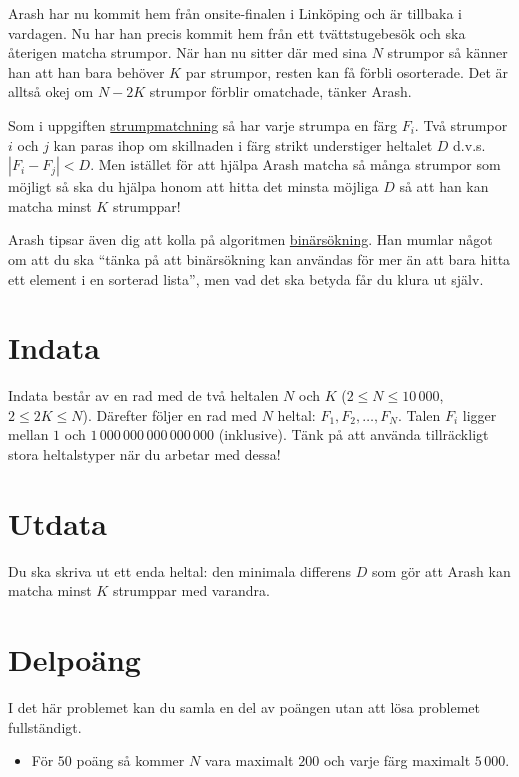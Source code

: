 
Arash har nu kommit hem från onsite-finalen i Linköping och är tillbaka i
vardagen. Nu har han precis kommit hem från ett tvättstugebesök och ska
återigen matcha strumpor. När han nu sitter där med sina $N$ strumpor
så känner han att han bara behöver $K$ par strumpor, resten kan få förbli
osorterade. Det är alltså okej om $N-2K$ strumpor förblir omatchade, tänker Arash.

Som i uppgiften \href{https://po.scrool.se/problems/strumpor}{strumpmatchning}
så har varje strumpa en färg $F_i$. Två strumpor $i$ och $j$ kan paras ihop om
skillnaden i färg strikt understiger heltalet $D$ d.v.s. $|F_{i} - F_{j}|<D$.
Men istället för att hjälpa Arash matcha så många strumpor som möjligt så ska
du hjälpa honom att hitta det minsta möjliga $D$
så att han kan matcha minst $K$ strumppar!

Arash tipsar även dig att kolla på algoritmen
\href{http://www.progolymp.se/Oldpage/ioitraning/dictionary.htm}{binärsökning}.
Han mumlar något om att du ska ``tänka på att binärsökning kan användas för mer än
att bara hitta ett element i en sorterad lista'', men vad det ska betyda får du
klura ut själv.

\section*{Indata}

Indata består av en rad med de två heltalen $N$ och $K$ ($2 \le N
\le 10\,000$, $2 \le 2K \le N$). Därefter följer en rad med $N$
heltal: $F_1, F_2, \dots, F_N$. Talen $F_i$ ligger mellan $1$
och $1\,000\,000\,000\,000\,000$ (inklusive). Tänk på att använda
tillräckligt stora heltalstyper när du arbetar med dessa!

\section*{Utdata}

Du ska skriva ut ett enda heltal: den minimala differens $D$ som gör att Arash kan
matcha minst $K$ strumppar med varandra.

\section*{Delpoäng}

I det här problemet kan du samla en del av poängen utan att lösa
problemet fullständigt.

\begin{itemize}
    \item För $50$ poäng så kommer $N$ vara maximalt $200$ och varje färg maximalt $5\,000$.
\end{itemize}
